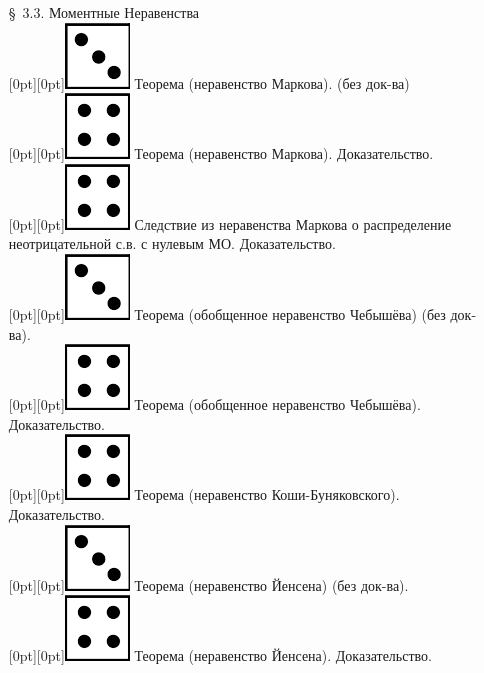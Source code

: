 \documentclass[10pt]{amsart}
\begin{document}
\begin{enumerate}
\begin{enumerate}
\item[\S\, 3.3.] Моментные Неравенства \\
 \raisebox{-1pt}[0pt][0pt]{\includegraphics[width=0.02\linewidth]{3.png}} Теорема (неравенство Маркова). (без док-ва) \\
 \raisebox{-1pt}[0pt][0pt]{\includegraphics[width=0.02\linewidth]{4.png}} Теорема (неравенство Маркова). Доказательство. \\
 \raisebox{-1pt}[0pt][0pt]{\includegraphics[width=0.02\linewidth]{4.png}} Следствие из неравенства Маркова о распределение неотрицательной с.в. с нулевым МО. Доказательство. \\
 \raisebox{-1pt}[0pt][0pt]{\includegraphics[width=0.02\linewidth]{3.png}} Теорема (обобщенное неравенство Чебышёва) (без док-ва). \\
 \raisebox{-1pt}[0pt][0pt]{\includegraphics[width=0.02\linewidth]{4.png}} Теорема (обобщенное неравенство Чебышёва). Доказательство. \\
 \raisebox{-1pt}[0pt][0pt]{\includegraphics[width=0.02\linewidth]{4.png}} Теорема (неравенство Коши-Буняковского). Доказательство. \\
 \raisebox{-1pt}[0pt][0pt]{\includegraphics[width=0.02\linewidth]{3.png}} Теорема (неравенство Йенсена) (без док-ва). \\
 \raisebox{-1pt}[0pt][0pt]{\includegraphics[width=0.02\linewidth]{4.png}} Теорема (неравенство Йенсена). Доказательство. \\


\end{enumerate}
\end{enumerate}
\end{document}
